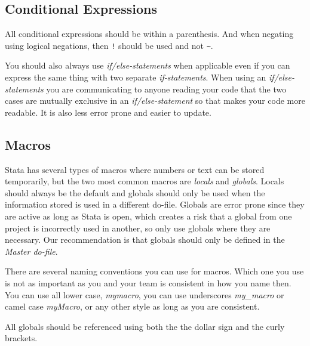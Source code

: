 
\subsection{Conditional Expressions}

All conditional expressions should be within a parenthesis. And when negating using logical negations,
then \verb|!| should be used and not \verb|~|.


You should also always use \textit{if/else-statements} when applicable even if you can express the same
thing with two separate \textit{if-statements}. When using an \textit{if/else-statements} you are
communicating to anyone reading your code that the two cases are mutually exclusive in an \textit{if/else-statement} 
so that makes your code more readable. It is also less error prone and easier to update.


\subsection{Macros}

Stata has several types of macros where numbers or text can be stored temporarily, but the two most common
macros are \textit{locals} and \textit{globals}. Locals should always be the default and globals should only 
be used when the information stored is used in a different do-file. Globals are error prone since they are 
active as long as Stata is open, which creates a risk that a global from one project is incorrectly used in 
another, so only use globals where they are necessary. Our recommendation is that globals should only be defined in the \textit{Master do-file}.

There are several naming conventions you can use for macros. Which one you use is not as important as you 
and your team is consistent in how you name then. You can use all lower case, \textit{mymacro}, you can use 
underscores \textit{my\_macro} or camel case \textit{myMacro}, or any other style as long as you are consistent.

All globals should be referenced using both the the dollar sign and the curly brackets.

